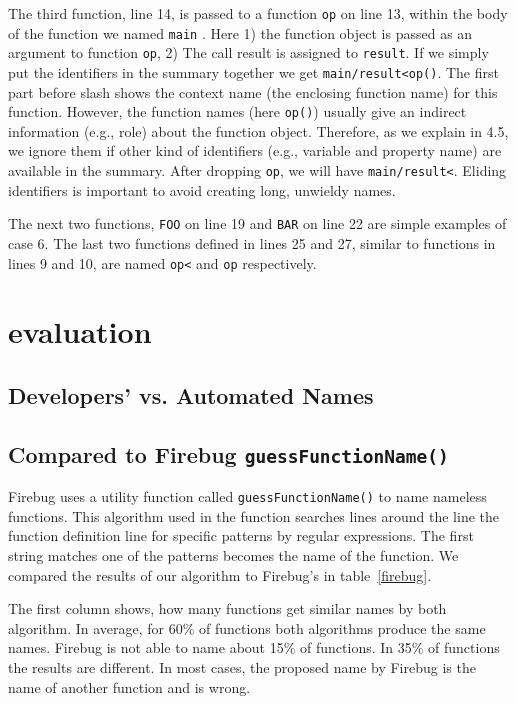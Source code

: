 \documentclass[10pt, preprint]{sigplanconf}
\begin{document}
{The third function, line 14, is passed to a function {\small\texttt{op}} on line 13, within the body of the function we named {\small\texttt{main}} . Here 1) the function object is passed as an argument to function {\small\texttt{op}}, 2) The call result is assigned to {\small\texttt{result}}. If we simply put the identifiers in the summary together we get {\small\texttt{main/result<op()}}. The first part before slash  shows the context name (the enclosing function name) for this function.  However, the function names (here {\small\texttt{op()}}) usually give an indirect information (e.g., role) about the function object. Therefore, as we explain in 4.5, we ignore them if other kind of identifiers (e.g., variable and property name) are available in the summary. After dropping {\small\texttt{op}}, we will have {\small\texttt{main/result<}}. Eliding identifiers is important to avoid creating long, unwieldy names.

The next two functions, {\small\texttt{FOO}} on line 19 and {\small\texttt{BAR}} on line 22 are simple examples of case 6.  The last two functions defined in lines 25 and 27, similar to functions in lines 9 and 10, are named {\small\texttt{op<}} and {\small\texttt{op}} respectively. 


\section{evaluation}


\subsection{Developers' vs. Automated Names}

\subsection{Compared to Firebug {\large \texttt{guessFunctionName()}}}
Firebug uses a utility function called {\small \texttt{guessFunctionName()}} to name nameless functions.
This algorithm used in the function searches lines around the line the function definition line for specific patterns by regular expressions. The
  first string matches one of the patterns becomes the name of the function. We compared the results of our algorithm to Firebug's in table~\ref{firebug}.
  
The first column shows, how many functions get similar names by both algorithm. In average, for 60\% of functions both algorithms produce the same names.
Firebug is not able to name about 15\% of functions. In 35\% of functions the results are different. In most cases, the proposed name by Firebug is the name of another function and is wrong.
  
}
\end{document}
